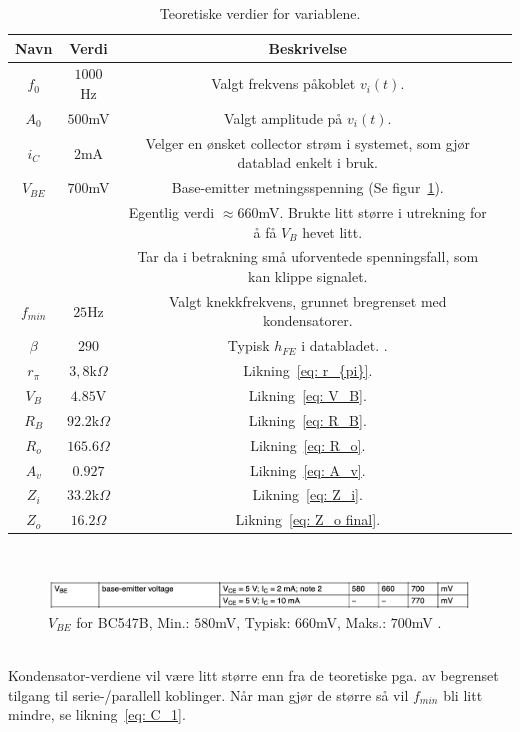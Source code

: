 \documentclass[a4paper,11pt,norsk]{article}
\begin{document}
\newpage

\begin{table}[htbp]
\centering
\begin{tabular}{ |c|c|c|c| } 
\hline
\textbf{Navn} & \textbf{Verdi} & \textbf{Beskrivelse}\\
\hline
$f_0$ & $1000$Hz & Valgt frekvens påkoblet $v_i(t)$.\\
\hline
$A_0$ & $500$mV & Valgt amplitude på $v_i(t)$.\\
\hline
$i_C$ & $2$mA & Velger en ønsket collector strøm i systemet, som gjør datablad enkelt i bruk. \\
\hline
$V_{BE}$ & $700$mV & Base-emitter metningsspenning (Se figur~\ref{fig: base-emitter on voltage}). \\
& & Egentlig verdi $\approx 660$mV. Brukte litt større i utrekning for å få $V_B$ hevet litt. \\
& & Tar da i betrakning små uforventede spenningsfall, som kan klippe signalet. \\
\hline
$f_{min}$ & $25$Hz & Valgt knekkfrekvens, grunnet bregrenset med kondensatorer.
\\
\hline
$\beta$ & $290$ & Typisk $h_{FE}$ i databladet. \cite{BC547B Datasheet}.
\\
\hline
$r_{\pi}$ & $3,8$k$\Omega$ & Likning~\ref{eq: r_{pi}}.
\\
\hline
$V_B$ & $4.85$V & Likning~\ref{eq: V_B}.
\\
\hline
$R_B$ & $92.2$k$\Omega$ & Likning~\ref{eq: R_B}.
\\
\hline
$R_o$ & $165.6\Omega$ & Likning~\ref{eq: R_o}.
\\
\hline
$A_v$ & $0.927$ & Likning~\ref{eq: A_v}. \\
\hline
$Z_i$ & $33.2$k$\Omega$ & Likning~\ref{eq: Z_i}.
\\
\hline
$Z_o$ & $16.2\Omega$  & Likning~\ref{eq: Z_o final}.
\\
\hline
\end{tabular}
\caption{Teoretiske verdier for variablene.}
\label{table: variabler}
\end{table}
\\
\begin{figure}[htbp]
    \centering
    \includegraphics[width=1.0\textwidth]{img/Base-emitter on voltage.png}
    \caption{$V_{BE}$ for BC547B, Min.: $580$mV, Typisk: $660$mV, Maks.: $700$mV  \cite{BC547B Datasheet}.}
    \label{fig: base-emitter on voltage}
\end{figure}\\
Kondensator-verdiene vil være litt større enn fra de teoretiske pga. av begrenset tilgang til serie-/parallell koblinger. Når man gjør de større så vil $f_{min}$ bli litt mindre, se likning~\ref{eq: C_1}. \\
\end{document}
